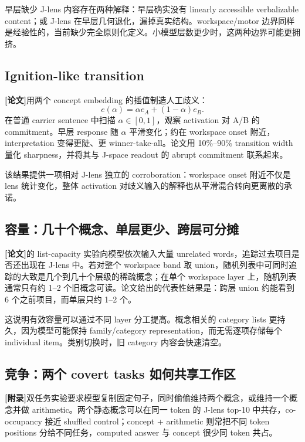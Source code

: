 \documentclass[10.5pt,a4paper]{ctexart}
\newcommand{\Paper}{\textbf{[论文]}}
\newcommand{\AppendixTag}{\textbf{[附录]}}
\begin{document}
\begin{warningclaim}
早层缺少 J-lens 内容存在两种解释：早层确实没有 linearly accessible verbalizable content；或 J-lens 在早层几何退化，漏掉真实结构。workspace/motor 边界同样是经验性的，当前缺少完全原则化定义。小模型层数更少时，这两种边界可能更拥挤。
\end{warningclaim}

\subsection{Ignition-like transition}
\Paper 用两个 concept embedding 的插值制造人工歧义：
\[
e(\alpha)=\alpha e_A+(1-\alpha)e_B.
\]
在普通 carrier sentence 中扫描 $\alpha\in[0,1]$，观察 activation 对 A/B 的 commitment。早层 response 随 $\alpha$ 平滑变化；约在 workspace onset 附近，interpretation 变得更陡、更 winner-take-all。论文用 10\%--90\% transition width 量化 sharpness，并将其与 J-space readout 的 abrupt commitment 联系起来。

该结果提供一项相对 J-lens 独立的 corroboration：workspace onset 附近不仅是 lens 统计变化，整体 activation 对歧义输入的解释也从平滑混合转向更离散的承诺。

\subsection{容量：几十个概念、单层更少、跨层可分摊}
\Paper 的 list-capacity 实验向模型依次输入大量 unrelated words，追踪过去项目是否还出现在 J-lens 中。若对整个 workspace band 取 union，随机列表中可同时追踪的大致是几个到几十个层级的稀疏概念；在单个 workspace layer 上，随机列表通常只有约 1--2 个旧概念可读。论文给出的代表性结果是：跨层 union 约能看到 6 个之前项目，而单层只约 1--2 个。

这说明有效容量可以通过不同 layer 分工提高。概念相关的 category lists 更持久，因为模型可能保持 family/category representation，而无需逐项存储每个 individual item。类别切换时，旧 category 内容会快速清空。

\subsection{竞争：两个 covert tasks 如何共享工作区}
\AppendixTag 双任务实验要求模型复制固定句子，同时偷偷维持两个概念，或维持一个概念并做 arithmetic。两个静态概念可以在同一 token 的 J-lens top-10 中共存，co-occupancy 接近 shuffled control；concept + arithmetic 则常把不同 token positions 分给不同任务，computed answer 与 concept 很少同 token 共占。
\end{document}
